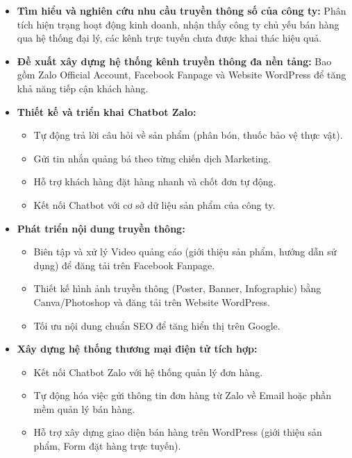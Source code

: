 \begin{itemize}
    \item \textbf{Tìm hiểu và nghiên cứu nhu cầu truyền thông số của công ty:} 
    Phân tích hiện trạng hoạt động kinh doanh, nhận thấy công ty chủ yếu bán hàng qua hệ thống đại lý, các kênh trực tuyến chưa được khai thác hiệu quả.
    
    \item \textbf{Đề xuất xây dựng hệ thống kênh truyền thông đa nền tảng:} 
    Bao gồm Zalo Official Account, Facebook Fanpage và Website WordPress để tăng khả năng tiếp cận khách hàng.
    
    \item \textbf{Thiết kế và triển khai Chatbot Zalo:}
    \begin{itemize}
        \item Tự động trả lời câu hỏi về sản phẩm (phân bón, thuốc bảo vệ thực vật).
        \item Gửi tin nhắn quảng bá theo từng chiến dịch Marketing.
        \item Hỗ trợ khách hàng đặt hàng nhanh và chốt đơn tự động.
        \item Kết nối Chatbot với cơ sở dữ liệu sản phẩm của công ty.
    \end{itemize}
    
    \item \textbf{Phát triển nội dung truyền thông:}
    \begin{itemize}
        \item Biên tập và xử lý Video quảng cáo (giới thiệu sản phẩm, hướng dẫn sử dụng) để đăng tải trên Facebook Fanpage.
        \item Thiết kế hình ảnh truyền thông (Poster, Banner, Infographic) bằng Canva/Photoshop và đăng tải trên Website WordPress.
        \item Tối ưu nội dung chuẩn SEO để tăng hiển thị trên Google.
    \end{itemize}
    
    \item \textbf{Xây dựng hệ thống thương mại điện tử tích hợp:}
    \begin{itemize}
        \item Kết nối Chatbot Zalo với hệ thống quản lý đơn hàng.
        \item Tự động hóa việc gửi thông tin đơn hàng từ Zalo về Email hoặc phần mềm quản lý bán hàng.
        \item Hỗ trợ xây dựng giao diện bán hàng trên WordPress (giới thiệu sản phẩm, Form đặt hàng trực tuyến).
    \end{itemize}
    

\end{itemize}
